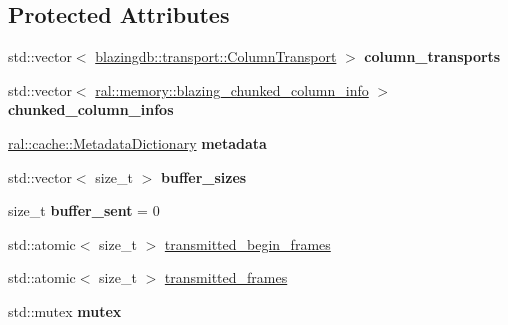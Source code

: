 \subsection*{Protected Attributes}
\begin{DoxyCompactItemize}
\item 
\mbox{\label{classcomm_1_1buffer__transport_ad5104419e3ecfca874534e12804b48fc}} 
std\+::vector$<$ \hyperlink{structblazingdb_1_1transport_1_1ColumnTransport}{blazingdb\+::transport\+::\+Column\+Transport} $>$ {\bfseries column\+\_\+transports}
\item 
\mbox{\label{classcomm_1_1buffer__transport_aa02f7f37ea5c8c4343e3289d6b9e132c}} 
std\+::vector$<$ \hyperlink{structral_1_1memory_1_1blazing__chunked__column__info}{ral\+::memory\+::blazing\+\_\+chunked\+\_\+column\+\_\+info} $>$ {\bfseries chunked\+\_\+column\+\_\+infos}
\item 
\mbox{\label{classcomm_1_1buffer__transport_a0b3c07ac433f3c7b114e677f399e3210}} 
\hyperlink{classral_1_1cache_1_1MetadataDictionary}{ral\+::cache\+::\+Metadata\+Dictionary} {\bfseries metadata}
\item 
\mbox{\label{classcomm_1_1buffer__transport_ae01314b9b03cd1278a20996dafc4dcb0}} 
std\+::vector$<$ size\+\_\+t $>$ {\bfseries buffer\+\_\+sizes}
\item 
\mbox{\label{classcomm_1_1buffer__transport_a3bf404422bf786f01a45066f48a751c6}} 
size\+\_\+t {\bfseries buffer\+\_\+sent} = 0
\item 
std\+::atomic$<$ size\+\_\+t $>$ \hyperlink{classcomm_1_1buffer__transport_af9c04a8af736e05980d62b7448142b30}{transmitted\+\_\+begin\+\_\+frames}
\item 
std\+::atomic$<$ size\+\_\+t $>$ \hyperlink{classcomm_1_1buffer__transport_a1c8254316bfcb05204a196bece986f68}{transmitted\+\_\+frames}
\item 
\mbox{\label{classcomm_1_1buffer__transport_aaef40e35a9a214ecb83d44493937449e}} 
std\+::mutex {\bfseries mutex}
\item 
\mbox{\label{classcomm_1_1buffer__transport_a57085a949db7cafedccdd6ce8db29b9e}} 

\end{DoxyCompactItemize}
